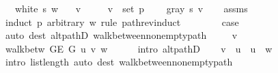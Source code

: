 \begin{isabellebody}
\ \ \ {\isachardoublequoteopen}white\ s\ w{\isachardoublequoteclose}\isanewline
\ \ \ v\ \isanewline
\ \ \ \ {\isachardoublequoteopen}v\ {\isasymin}\ set\ p{\isachardoublequoteclose}\isanewline
\ \ \ \ {\isachardoublequoteopen}gray\ s\ v{\isachardoublequoteclose}\isanewline
%
\isadelimproof
\ \ %
\endisadelimproof
%
\isatagproof
{}\isamarkupfalse%
\ assms\isanewline
{}\isamarkupfalse%
\ {\isacharparenleft}{\kern0pt}induct\ p\ arbitrary{\isacharcolon}{\kern0pt}\ w\ rule{\isacharcolon}{\kern0pt}\ path{\isacharunderscore}{\kern0pt}rev{\isacharunderscore}{\kern0pt}induct{\isacharparenright}{\kern0pt}\isanewline
\ \ \isamarkupfalse%
\ {}\isanewline
\ \ \isamarkupfalse%
\ {\isacharquery}{\kern0pt}case\isanewline
\ \ \ \ \isamarkupfalse%
\ {\isacharparenleft}{\kern0pt}auto\ dest{\isacharcolon}{\kern0pt}\ alt{\isacharunderscore}{\kern0pt}pathD{\isacharparenleft}{\kern0pt}{}{\isacharparenright}{\kern0pt}\ walk{\isacharunderscore}{\kern0pt}between{\isacharunderscore}{\kern0pt}nonempty{\isacharunderscore}{\kern0pt}path{\isacharparenleft}{\kern0pt}{}{\isacharparenright}{\kern0pt}{\isacharparenright}{\kern0pt}\isanewline
{}\isamarkupfalse%
\isanewline
\ \ \isamarkupfalse%
\ {\isacharparenleft}{\kern0pt}{}\ v{\isacharparenright}{\kern0pt}\isanewline
\ \ \isamarkupfalse%
\ {\isachardoublequoteopen}walk{\isacharunderscore}{\kern0pt}betw\ {\isacharparenleft}{\kern0pt}G{\isachardot}{\kern0pt}E\ G{\isacharparenright}{\kern0pt}\ u\ {\isacharbrackleft}{\kern0pt}v{\isacharbrackright}{\kern0pt}\ w{\isachardoublequoteclose}\isanewline
\ \ \ \ \isamarkupfalse%
\ {\isacharparenleft}{\kern0pt}intro\ alt{\isacharunderscore}{\kern0pt}pathD{\isacharparenleft}{\kern0pt}{}{\isacharparenright}{\kern0pt}{\isacharparenright}{\kern0pt}\isanewline
\ \ \isamarkupfalse%
\ {\isachardoublequoteopen}{\isacharbrackleft}{\kern0pt}v{\isacharbrackright}{\kern0pt}\ {\isacharequal}{\kern0pt}\ {\isacharbrackleft}{\kern0pt}u{\isacharbrackright}{\kern0pt}\ {\isasymand}\ u\ {\isacharequal}{\kern0pt}\ w{\isachardoublequoteclose}\isanewline
\ \ \ \ \isamarkupfalse%
\ {\isacharparenleft}{\kern0pt}intro\ list{\isacharunderscore}{\kern0pt}length{\isacharunderscore}{\kern0pt}{}{\isacharparenright}{\kern0pt}\ {\isacharparenleft}{\kern0pt}auto\ dest{\isacharcolon}{\kern0pt}\ walk{\isacharunderscore}{\kern0pt}between{\isacharunderscore}{\kern0pt}nonempty{\isacharunderscore}{\kern0pt}path{\isacharparenleft}{\kern0pt}{}{\isacharminus}{\kern0pt}{}{\isacharparenright}{\kern0pt}{\isacharparenright}{\kern0pt}\isanewline

\end{isabellebody}
